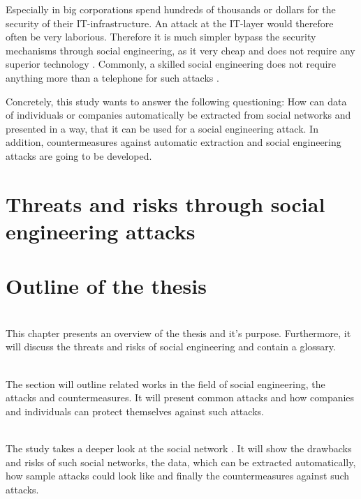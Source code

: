 Especially in big corporations spend hundreds of thousands or dollars for the
security of their IT-infrastructure. An attack at the IT-layer would therefore
often be very laborious. Therefore it is much simpler bypass the security
mechanisms through social engineering, as it very cheap and does not require
any superior technology \cite{winkler1995}. Commonly, a skilled social
engineering does not require anything more than a telephone for such attacks
\cite{mitnick2003}.

Concretely, this study wants to answer the following questioning:
How can data of individuals or companies automatically be extracted
from social networks and presented in a way, that it can be used for a social
engineering attack. In addition, countermeasures against automatic extraction
and social engineering attacks are going to be developed.

\section{Threats and risks through social engineering attacks}

\newpage
\section{Outline of the thesis}

\vspace{0.5em}\\
\noindent This chapter presents an overview of the thesis and it's purpose.
Furthermore, it will discuss the threats and risks of social engineering and
contain a glossary.

\vspace{0.5em}\\
\noindent The section will outline related works in the field of social
engineering, the attacks and countermeasures. It will present common attacks
and how companies and individuals can protect themselves against such attacks.

\vspace{0.5em}\\
\noindent The study takes a deeper look at the social network \Twitter. It will
show the drawbacks and risks of such social networks, the data, which can be
extracted automatically, how sample attacks could look like and finally the
countermeasures against such attacks.

